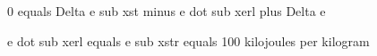 0 equals Delta e sub xst minus e dot sub xerl plus Delta e

e dot sub xerl equals e sub xstr equals 100 kilojoules per kilogram